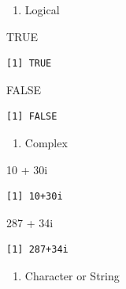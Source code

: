 \documentclass[
  letterpaper,
  DIV=11,
  numbers=noendperiod]{scrreprt}
\newenvironment{Shaded}{\begin{snugshade}}{\end{snugshade}}
\newcommand{\ConstantTok}[1]{\textcolor[rgb]{0.56,0.35,0.01}{#1}}
\newcommand{\DecValTok}[1]{\textcolor[rgb]{0.68,0.00,0.00}{#1}}
\newcommand{\NormalTok}[1]{\textcolor[rgb]{0.00,0.23,0.31}{#1}}
\newcommand{\SpecialCharTok}[1]{\textcolor[rgb]{0.37,0.37,0.37}{#1}}
\providecommand{\tightlist}{%
  \setlength{\itemsep}{0pt}\setlength{\parskip}{0pt}}\usepackage{longtable,booktabs,array}
\begin{document}
\begin{enumerate}
\def\labelenumi{\arabic{enumi}.}
\setcounter{enumi}{2}
\tightlist
\item
  Logical
\end{enumerate}

\begin{Shaded}
\begin{Highlighting}[]
\ConstantTok{TRUE}
\end{Highlighting}
\end{Shaded}

\begin{verbatim}
[1] TRUE
\end{verbatim}

\begin{Shaded}
\begin{Highlighting}[]
\ConstantTok{FALSE}
\end{Highlighting}
\end{Shaded}

\begin{verbatim}
[1] FALSE
\end{verbatim}

\begin{enumerate}
\def\labelenumi{\arabic{enumi}.}
\setcounter{enumi}{3}
\tightlist
\item
  Complex
\end{enumerate}

\begin{Shaded}
\begin{Highlighting}[]
\DecValTok{10} \SpecialCharTok{+} \DecValTok{30}\NormalTok{i}
\end{Highlighting}
\end{Shaded}

\begin{verbatim}
[1] 10+30i
\end{verbatim}

\begin{Shaded}
\begin{Highlighting}[]
\DecValTok{287} \SpecialCharTok{+} \DecValTok{34}\NormalTok{i}
\end{Highlighting}
\end{Shaded}

\begin{verbatim}
[1] 287+34i
\end{verbatim}

\begin{enumerate}
\def\labelenumi{\arabic{enumi}.}
\setcounter{enumi}{4}
\tightlist
\item
  Character or String
\end{enumerate}
\end{document}
